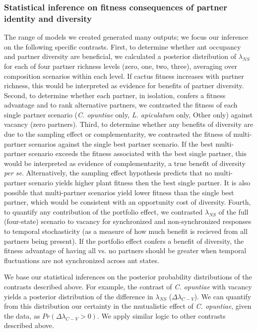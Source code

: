 \documentclass[11pt]{article}
\begin{document}
\subsubsection*{Statistical inference on fitness consequences of partner identity and diversity}
The range of models we created generated many outputs; we focus our inference on the following specific contrasts. 
First, to determine whether ant occupancy and partner diversity are beneficial, we calculated a posterior distribution of $\lambda_{NS}$ for each of four partner richness levels (zero, one, two, three), averaging over composition scenarios within each level. 
If cactus fitness increases with partner richness, this would be interpreted as evidence for benefits of partner diversity. 
Second, to determine whether each partner, in isolation, confers a fitness advantage and to rank alternative partners, we contrasted the fitness of each single partner scenario (\textit{C. opuntiae} only, \textit{L. apiculatum} only, Other only) against vacancy (zero partners). 
Third, to determine whether any benefits of diversity are due to the sampling effect or complementarity, we contrasted the fitness of multi-partner scenarios against the single best partner scenario. 
If the best multi-partner scenario exceeds the fitness associated with the best single partner, this would be interpreted as evidence of complementarity, a true benefit of diversity \emph{per se}. 
Alternatively, the sampling effect hypothesis predicts that no multi-partner scenario yields higher plant fitness then the best single partner. 
It is also possible that multi-partner scenarios yield lower fitness than the single best partner, which would be consistent with an opportunity cost of diversity. 
Fourth, to quantify any contribution of the portfolio effect, we contrasted $\lambda_{NS}$ of the full (four-state) scenario to vacancy for synchronized and non-synchronized responses to temporal stochasticity (as a measure of how much benefit is recieved from all partners being present). 
If the portfolio effect confers a benefit of diversity, the fitness advantage of having all vs. no partners should be greater when temporal fluctuations are not synchronized across ant states.

We base our statistical inferences on the posterior probability distributions of the contrasts described above. 
For example, the contrast of \textit{C. opuntiae} with vacancy yields a posterior distribution of the difference in $\lambda_{NS}$ ($\Delta\lambda_{C-V}$). 
We can quantify from this distribution our certainty in the mutualistic effect of \textit{C. opuntiae}, given the data, as $Pr(\Delta\lambda_{C-V}>0)$. 
We apply similar logic to other contrasts described above. 
\end{document}
